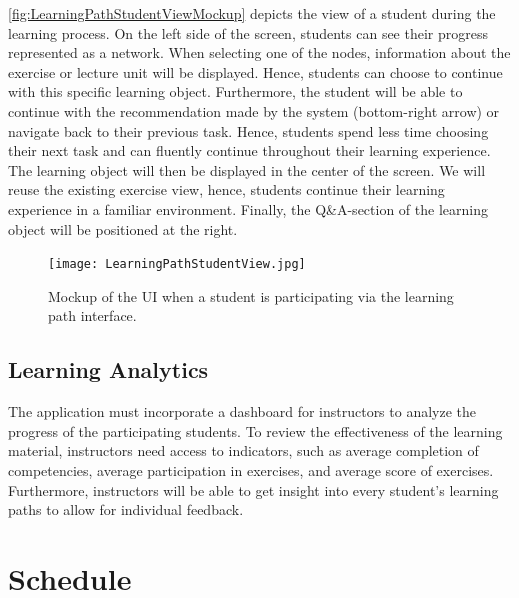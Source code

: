 \documentclass[a4paper,12pt,twoside]{article}
\begin{document}
\autoref{fig:LearningPathStudentViewMockup} depicts the view of a student during the learning process. On the left side of the screen, students can see their
progress represented as a network. When selecting one of the nodes, information about the exercise or lecture unit will be displayed. Hence, students can choose
to continue with this specific learning object. Furthermore, the student will be able to continue with the recommendation made by the system (bottom-right arrow)
or navigate back to their previous task. Hence, students spend less time choosing their next task and can fluently
continue throughout their learning experience.
The learning object will then be displayed in the center of the screen. We will reuse the existing exercise view, hence, students continue their learning experience in
a familiar environment. Finally, the Q\&A-section of the learning object will be positioned at the right.

\begin{figure}[h!]
        \centering
        \texttt{[image: LearningPathStudentView.jpg]}
        \caption{Mockup of the UI when a student is participating via the learning path interface.}
        \label{fig:LearningPathStudentViewMockup}
\end{figure}

\subsection{Learning Analytics}
The application must incorporate a dashboard for instructors to analyze the progress of the participating students. To review the effectiveness of the learning material,
instructors need access to indicators, such as average completion of competencies, average participation in exercises, and average score of exercises.
Furthermore, instructors will be able to get insight into every student's learning paths to allow for individual feedback.


\section{Schedule}
\end{document}
